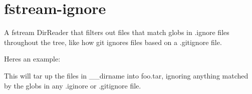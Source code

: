 \chapter{fstream-\/ignore}
\hypertarget{md__c_1_2_users_2_s_t_r_i_d_e_r_2source_2repos_2_ainslie_a_p_i_2wwwroot_2lib_2jquery-ui_2node__m3f18b10bc1568f169640e6e1ec9438cf}{}\label{md__c_1_2_users_2_s_t_r_i_d_e_r_2source_2repos_2_ainslie_a_p_i_2wwwroot_2lib_2jquery-ui_2node__m3f18b10bc1568f169640e6e1ec9438cf}
\label{md__c_1_2_users_2_s_t_r_i_d_e_r_2source_2repos_2_ainslie_a_p_i_2wwwroot_2lib_2jquery-ui_2node__m3f18b10bc1568f169640e6e1ec9438cf_autotoc_md2369}%
%
 A fstream Dir\+Reader that filters out files that match globs in {\ttfamily .ignore} files throughout the tree, like how git ignores files based on a {\ttfamily .gitignore} file.

Here\textquotesingle{}s an example\+:


\begin{DoxyCode}{0}
\DoxyCodeLine{\ \ \ \ \ \ \ \})}
\DoxyCodeLine{\ \ \})}

\end{DoxyCode}


This will tar up the files in \+\_\+\+\_\+dirname into {\ttfamily foo.\+tar}, ignoring anything matched by the globs in any .iginore or .gitignore file. 